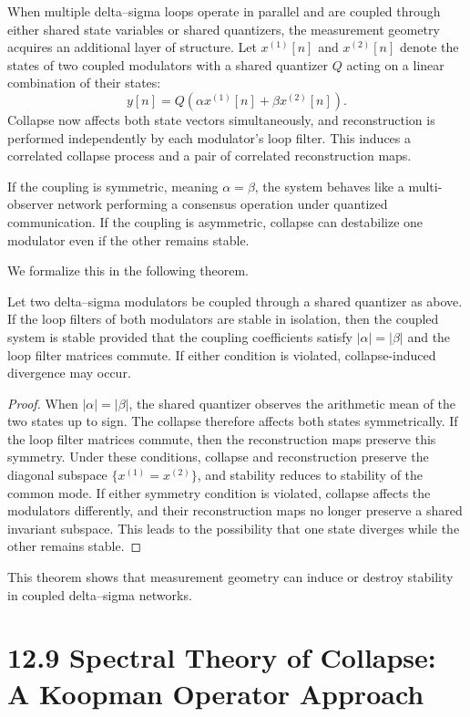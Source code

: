 When multiple delta--sigma loops operate in parallel and are coupled through either shared state variables or shared quantizers, the measurement geometry acquires an additional layer of structure. Let $x^{(1)}[n]$ and $x^{(2)}[n]$ denote the states of two coupled modulators with a shared quantizer $Q$ acting on a linear combination of their states:
\[
y[n] = Q(\alpha x^{(1)}[n] + \beta x^{(2)}[n]).
\]
Collapse now affects both state vectors simultaneously, and reconstruction is performed independently by each modulator’s loop filter. This induces a correlated collapse process and a pair of correlated reconstruction maps.

If the coupling is symmetric, meaning $\alpha = \beta$, the system behaves like a multi-observer network performing a consensus operation under quantized communication. If the coupling is asymmetric, collapse can destabilize one modulator even if the other remains stable.

We formalize this in the following theorem.

\begin{theorem}
Let two delta--sigma modulators be coupled through a shared quantizer as above. If the loop filters of both modulators are stable in isolation, then the coupled system is stable provided that the coupling coefficients satisfy $|\alpha| = |\beta|$ and the loop filter matrices commute. If either condition is violated, collapse-induced divergence may occur.
\end{theorem}

\begin{proof}
When $|\alpha| = |\beta|$, the shared quantizer observes the arithmetic mean of the two states up to sign. The collapse therefore affects both states symmetrically. If the loop filter matrices commute, then the reconstruction maps preserve this symmetry. Under these conditions, collapse and reconstruction preserve the diagonal subspace $\{x^{(1)} = x^{(2)}\}$, and stability reduces to stability of the common mode. If either symmetry condition is violated, collapse affects the modulators differently, and their reconstruction maps no longer preserve a shared invariant subspace. This leads to the possibility that one state diverges while the other remains stable.
\end{proof}

This theorem shows that measurement geometry can induce or destroy stability in coupled delta--sigma networks.

\section*{12.9 Spectral Theory of Collapse: A Koopman Operator Approach}

